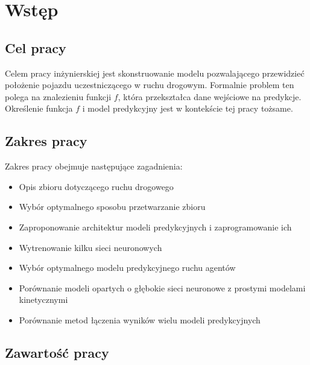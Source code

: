 \chapter*{Wstęp}

\thispagestyle{chapterBeginStyle}

\section*{Cel pracy}

Celem pracy inżynierskiej jest skonstruowanie modelu pozwalającego przewidzieć położenie pojazdu uczestniczącego w ruchu drogowym. Formalnie problem ten polega na znalezieniu funkcji $f$, która przekształca dane wejściowe na predykcje. Określenie funkcja $f$ i model predykcyjny jest w kontekście tej pracy tożsame.

\section*{Zakres pracy}

\noindent Zakres pracy obejmuje następujące zagadnienia:

\begin{itemize}
    \setlength{\itemsep}{1pt}
    \setlength{\parskip}{0pt}
    \setlength{\parsep}{0pt}
    \item Opis zbioru dotyczącego ruchu drogowego
    \item Wybór optymalnego sposobu przetwarzanie zbioru
    \item Zaproponowanie architektur modeli predykcyjnych i zaprogramowanie ich
    \item Wytrenowanie kilku sieci neuronowych
    \item Wybór optymalnego modelu predykcyjnego ruchu agentów
    \item Porównanie modeli opartych o głębokie sieci neuronowe z prostymi modelami kinetycznymi
    \item Porównanie metod łączenia wyników wielu modeli predykcyjnych
\end{itemize}

\section*{Zawartość pracy}

